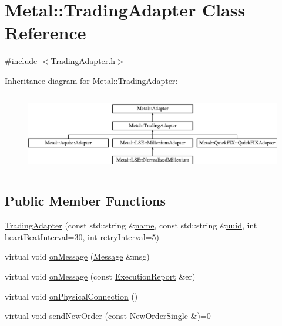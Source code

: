 \hypertarget{classMetal_1_1TradingAdapter}{}\section{Metal\+:\+:Trading\+Adapter Class Reference}
\label{classMetal_1_1TradingAdapter}


{\ttfamily \#include $<$Trading\+Adapter.\+h$>$}

Inheritance diagram for Metal\+:\+:Trading\+Adapter\+:\begin{figure}[H]
\begin{center}
\leavevmode
\includegraphics[height=3.489097cm]{classMetal_1_1TradingAdapter}
\end{center}
\end{figure}
\subsection*{Public Member Functions}
\begin{DoxyCompactItemize}
\item 
\hyperlink{classMetal_1_1TradingAdapter_a469004504d9929b76a9c38cf7d9bd9f9}{Trading\+Adapter} (const std\+::string \&\hyperlink{classMetal_1_1Adapter_a8d86d5f95e20d3b9feeb4f0bedcf5785}{name}, const std\+::string \&\hyperlink{classMetal_1_1Adapter_a5175a897fa7c1ad65ebf03baea3c5479}{uuid}, int heart\+Beat\+Interval=30, int retry\+Interval=5)
\item 
virtual void \hyperlink{classMetal_1_1TradingAdapter_abe4a886b1942247785641c93c02def54}{on\+Message} (\hyperlink{classMetal_1_1Message}{Message} \&msg)
\item 
virtual void \hyperlink{classMetal_1_1TradingAdapter_a44332505b213c0428d901ef6a530efff}{on\+Message} (const \hyperlink{namespaceMetal_af4294c176f6aecf9f75e9b106b117aa1}{Execution\+Report} \&er)
\item 
virtual void \hyperlink{classMetal_1_1TradingAdapter_a10208ab030e4b3a9db4dc71206a1812e}{on\+Physical\+Connection} ()
\item 
virtual void \hyperlink{classMetal_1_1TradingAdapter_abccc3fdb238887112e1a0820a70f0fce}{send\+New\+Order} (const \hyperlink{classMetal_1_1NewOrderSingle}{New\+Order\+Single} \&)=0
\end{DoxyCompactItemize}
